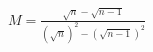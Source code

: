 \documentclass[preview]{standalone}
\begin{document}
\begin{align*}
M = \frac{\sqrt{n}-\sqrt{n-1}} {(\sqrt{n})^2 - (\sqrt{n-1})^2}
\end{align*}
\end{document}
